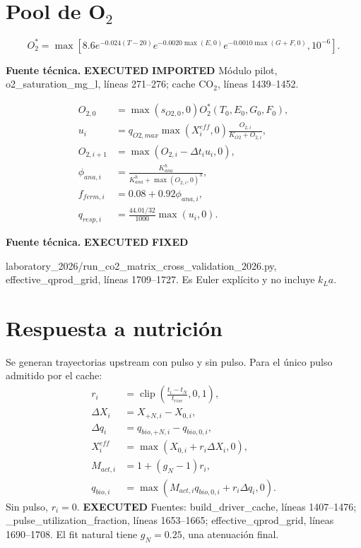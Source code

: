 \documentclass[11pt]{article}
\newcommand{\E}[1]{%
  \nobreak\hspace{0.16em}%
  \begingroup
  \setlength{\fboxsep}{1.5pt}%
  \colorbox{auditpale}{\textcolor{auditblue}{\sffamily\bfseries\scriptsize #1}}%
  \endgroup\hspace{0.16em}%
}
\newcommand{\code}[1]{{\small\ttfamily #1}}
\newcommand{\sourceinfo}[1]{%
  \par\vspace{-0.15em}%
  {\small\color{auditslate}\sffamily\textbf{Fuente técnica.}\enspace #1\par}%
  \vspace{0.25em}%
}
\DeclareMathOperator{\clip}{clip}
\begin{document}
\section{Pool de O$_2$}

\begin{equation}
O_2^*=\max\left[8.6e^{-0.024(T-20)}e^{-0.0020\max(E,0)}
e^{-0.0010\max(G+F,0)},10^{-6}\right]. \tag{R37}
\end{equation}
\sourceinfo{\E{EXECUTED}\E{IMPORTED} Módulo pilot,
\code{o2\_saturation\_mg\_l}, líneas 271--276; cache CO$_2$,
líneas 1439--1452.}

\begin{align}
O_{2,0}&=\max(s_{O2,0},0)O_2^*(T_0,E_0,G_0,F_0), \tag{R38}\\
u_i&=q_{O2,max}\max(X_i^{eff},0)\frac{O_{2,i}}{K_{O2}+O_{2,i}}, \tag{R39}\\
O_{2,i+1}&=\max(O_{2,i}-\Delta t_i u_i,0), \tag{R40}\\
\phi_{ana,i}&=\frac{K_{ana}^{h}}{K_{ana}^{h}+\max(O_{2,i},0)^h}, \tag{R41}\\
f_{ferm,i}&=0.08+0.92\phi_{ana,i}, \tag{R42}\\
q_{resp,i}&=\frac{44.01/32}{1000}\max(u_i,0). \tag{R43}
\end{align}
\sourceinfo{\E{EXECUTED}\E{FIXED}
\code{laboratory\_2026/run\_co2\_matrix\_cross\_validation\_2026.py},
\code{effective\_qprod\_grid}, líneas 1709--1727. Es Euler explícito y no
incluye $k_La$.}

\section{Respuesta a nutrición}

Se generan trayectorias upstream con pulso y sin pulso. Para el único pulso
admitido por el cache:
\begin{align}
r_i&=\clip\!\left(\frac{t_i-t_N}{t_{rise}},0,1\right), \tag{R44}\\
\Delta X_i&=X_{+N,i}-X_{0,i}, \tag{R45}\\
\Delta q_i&=q_{bio,+N,i}-q_{bio,0,i}, \tag{R46}\\
X_i^{eff}&=\max(X_{0,i}+r_i\Delta X_i,0), \tag{R47}\\
M_{act,i}&=1+(g_N-1)r_i, \tag{R48}\\
q_{bio,i}&=\max(M_{act,i}q_{bio,0,i}+r_i\Delta q_i,0). \tag{R49}
\end{align}
Sin pulso, $r_i=0$. \E{EXECUTED} Fuentes: \code{build\_driver\_cache},
líneas 1407--1476; \code{\_pulse\_utilization\_fraction}, líneas 1653--1665;
\code{effective\_qprod\_grid}, líneas 1690--1708. El fit natural tiene
$g_N=0.25$, una atenuación final.
\end{document}
